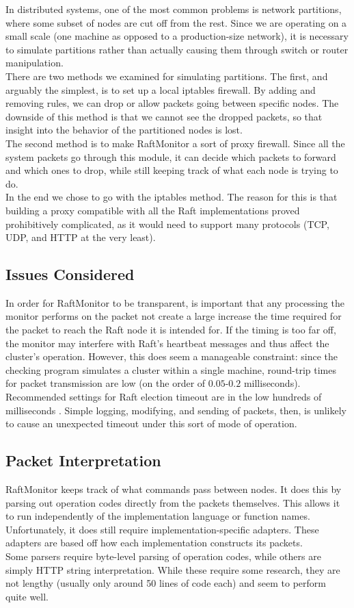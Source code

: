 \documentclass[UTF8]{article}
\begin{document}
In distributed systems, one of the most common problems is network partitions, where some subset of nodes are cut off from the rest. Since we are operating on a small scale (one machine as opposed to a production-size network), it is necessary to simulate partitions rather than actually causing them through switch or router manipulation.
\\ \indent There are two methods we examined for simulating partitions. The first, and arguably the simplest, is to set up a local iptables firewall. By adding and removing rules, we can drop or allow packets going between specific nodes. The downside of this method is that we cannot see the dropped packets, so that insight into the behavior of the partitioned nodes is lost.
\\ \indent The second method is to make RaftMonitor a sort of proxy firewall. Since all the system packets go through this module, it can decide which packets to forward and which ones to drop, while still keeping track of what each node is trying to do.
\\ \indent In the end we chose to go with the iptables method. The reason for this is that building a proxy compatible with all the Raft implementations proved prohibitively complicated, as it would need to support many protocols (TCP, UDP, and HTTP at the very least). 

\subsection{Issues Considered}

In order for RaftMonitor to be transparent, is important that any processing the monitor performs on the packet not create a large increase the time required for the packet to reach the Raft node it is intended for. If the timing is too far off, the monitor may interfere with Raft's heartbeat messages and thus affect the cluster's operation. However, this does seem a manageable constraint: since the checking program simulates a cluster within a single machine, round-trip times for packet transmission are low (on the order of $0.05$-$0.2$ milliseconds). Recommended settings for Raft election timeout are in the low hundreds of milliseconds \cite{raftPaper}. Simple logging, modifying, and sending of packets, then, is unlikely to cause an unexpected timeout under this sort of mode of operation.

\subsection{Packet Interpretation}
RaftMonitor keeps track of what commands pass between nodes. It does this by parsing out operation codes directly from the packets themselves. This allows it to run independently of the implementation language or function names. Unfortunately, it does still require implementation-specific adapters. These adapters are based off how each implementation constructs its packets.
\\ \indent Some parsers require byte-level parsing of operation codes, while others are  simply HTTP string interpretation. While these require some research, they are not lengthy (usually only around 50 lines of code each) and seem to perform quite well.
\end{document}

